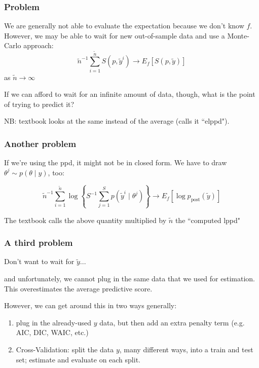 \documentclass{beamer}
\begin{document}
\begin{frame}
\frametitle{Problem}


We are generally not able to evaluate the expectation because we don't know $f$. However, we may be able to wait for new out-of-sample data and use a Monte-Carlo approach:
\[
\tilde{n}^{-1}\sum_{i=1}^{\tilde{n}} S(p,\tilde{y}^i) \to E_f[S(p,\tilde{y})]
\]
as $\tilde{n} \to \infty$
\newline
\pause

If we can afford to wait for an infinite amount of data, though, what is the point of trying to predict it?
\newline
\pause

NB: textbook looks at the same instead of the average (calls it ``elppd").
\end{frame}

\begin{frame}
\frametitle{Another problem}

If we're using the ppd, it might not be in closed form. We have to draw $\theta^j \sim p(\theta \mid y)$, too:

\[
\tilde{n}^{-1}\sum_{i=1}^{\tilde{n}} \log \left\{ S^{-1} \sum_{j=1}^{S} p(\tilde{y}^i \mid \theta^j) \right\} \to E_f[\log p_{\text{post}}(\tilde{y})]
\]

The textbook calls the above quantity multiplied by $\tilde{n}$ the ``computed lppd"
\end{frame}


\begin{frame}
\frametitle{A third problem}

Don't want to wait for $\tilde{y}$...
\newline

and unfortunately, we cannot plug in the same data that we used for estimation. This overestimates the average predictive score. 
\newline

However, we can get around this in two ways generally:
\begin{enumerate}
\item plug in the already-used $y$ data, but then add an extra penalty term (e.g. AIC, DIC, WAIC, etc.)
\item Cross-Validation: split the data $y$, many different ways, into a train and test set; estimate and evaluate on each split.
\end{enumerate}

\end{frame}
\end{document}
